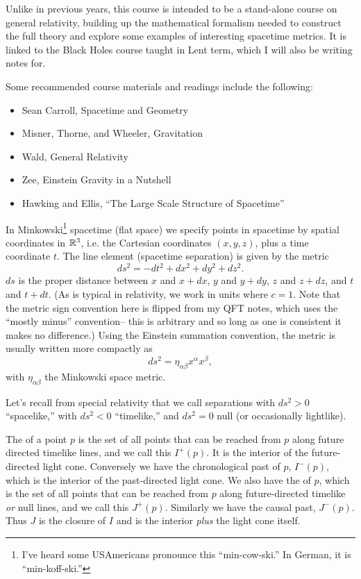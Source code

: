 Unlike in previous years, this course is intended to be a stand-alone course on general relativity, building up the mathematical formalism needed to construct the full theory and explore some examples of interesting spacetime metrics. It is linked to the Black Holes course taught in Lent term, which I will also be writing notes for.

Some recommended course materials and readings include the following:
\begin{itemize}
\item Sean Carroll, Spacetime and Geometry
\item Misner, Thorne, and Wheeler, Gravitation
\item Wald, General Relativity
\item Zee, Einstein Gravity in a Nutshell
\item Hawking and Ellis, ``The Large Scale Structure of Spacetime''
\end{itemize}

In Minkowski\footnote{I've heard some USAmericans pronounce this ``min-cow-ski.'' In German, it is ``min-koff-ski.''} spacetime (flat space) we specify points in spacetime by spatial coordinates in $\mathbb{R}^3$, i.e. the Cartesian coordinates $(x,y,z)$, plus a time coordinate $t$. The line element (spacetime separation) is given by the metric
$$ds^2=-dt^2+dx^2+dy^2+dz^2.$$
$ds$ is the proper distance between $x$ and $x+dx$, $y$ and $y+dy$, $z$ and $z+dz$, and $t$ and $t+dt$. (As is typical in relativity, we work in units where $c=1$. Note that the metric sign convention here is flipped from my QFT notes, which uses the ``mostly minus'' convention-- this is arbitrary and so long as one is consistent it makes no difference.) Using the Einstein summation convention, the metric is usually written more compactly as $$ds^2=\eta_{\alpha\beta}x^\alpha x^\beta,$$ with $\eta_{\alpha\beta}$ the Minkowski space metric.

Let's recall from special relativity that we call separations with $ds^2>0$ ``spacelike,'' with $ds^2<0$ ``timelike,'' and $ds^2=0$ null (or occasionally lightlike).
\begin{defn}
The  of a point $p$ is the set of all points that can be reached from $p$ along future directed timelike lines, and we call this $I^+(p)$. It is the interior of the future-directed light cone. Conversely we have the chronological past of $p$, $I^-(p)$, which is the interior of the past-directed light cone. We also have the  of $p$, which is the set of all points that can be reached from $p$ along future-directed timelike \emph{or} null lines, and we call this $J^+(p)$. Similarly we have the causal past, $J^-(p)$. Thus $J$ is the closure of $I$ and is the interior \emph{plus} the light cone itself.
\end{defn}


